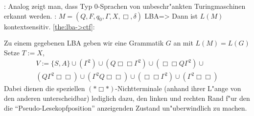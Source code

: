 \remark:{
  Analog zeigt man, dass Typ 0-Sprachen von unbeschr"ankten Turingmaschinen
  erkannt werden.
  }
\theorem:
  $M=(Q,F,q_0,\Gamma,X,\Box,\delta)$ LBA=>{
  \label{the:lba->ctf}
  Dann ist $L(M)$ kontextsensitiv.
  }
\proof \ref{the:lba->ctf}:{
  Zu einem gegebenen LBA geben wir eine Grammatik $G$ an mit $L(M)=L(G)$
  Setze $T:=X$,
  \begin{multline*}
    V:=\{S,A\}\cup(\Gamma^2)\cup(Q\Box\Box\Gamma^2)\cup(\Box\Box Q\Gamma^2)\cup\\
    (Q\Gamma^2\Box\Box)\cup(\Gamma^2Q\Box\Box)\cup(\Box\Box\Gamma^2)\cup
    (\Gamma^2\Box\Box)
    \end{multline*}
  Dabei dienen die speziellen $(*\Box*)$-Nichtterminale (anhand ihrer
  L"ange von den anderen unterscheidbar) lediglich dazu, den linken und
  rechten Rand f"ur den die ``Pseudo-Lesekopfposition'' anzeigenden Zustand
  un"uberwindlich zu machen. 
  
}
